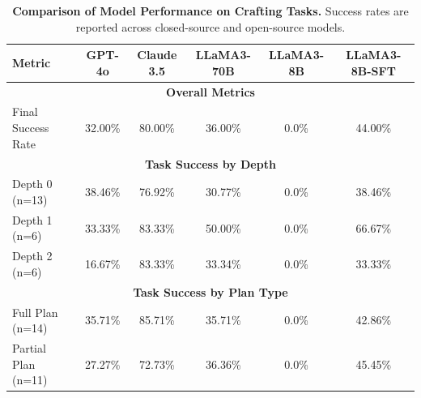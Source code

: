 \begin{table}
\centering
\small
\setlength{\tabcolsep}{4pt} %
\renewcommand{\arraystretch}{1.2} %
\begin{tabular}{lccccc}
\toprule
\textbf{Metric} & \textbf{GPT-4o} & \textbf{Claude 3.5} & \textbf{LLaMA3-70B} & \textbf{LLaMA3-8B} & \textbf{LLaMA3-8B-SFT} \\ 
\midrule
\multicolumn{6}{c}{\textbf{Overall Metrics}} \\ 
\midrule
Final Success Rate     & 32.00\%  & 80.00\%  & 36.00\%  & 0.0\%   & 44.00\% \\ 
\midrule
\multicolumn{6}{c}{\textbf{Task Success by Depth}} \\ 
\midrule
Depth 0 (n=13)  & 38.46\%  & 76.92\%  & 30.77\%  & 0.0\%  & 38.46\%  \\  
Depth 1 (n=6)   & 33.33\%  & 83.33\%  & 50.00\%  & 0.0\%  & 66.67\% \\  
Depth 2 (n=6)   & 16.67\%  & 83.33\%  & 33.34\%  & 0.0\%  & 33.33\% \\  
\midrule
\multicolumn{6}{c}{\textbf{Task Success by Plan Type}} \\ 
\midrule
Full Plan (n=14)    & 35.71\%  & 85.71\%  & 35.71\%  & 0.0\%  & 42.86\%  \\  
Partial Plan (n=11) & 27.27\%  & 72.73\%  & 36.36\%  & 0.0\%  & 45.45\%  \\  
\bottomrule
\end{tabular}
\caption{\textbf{Comparison of Model Performance on Crafting Tasks.} Success rates are reported across closed-source and open-source models.}
\label{tab:model-performance}
\end{table}

